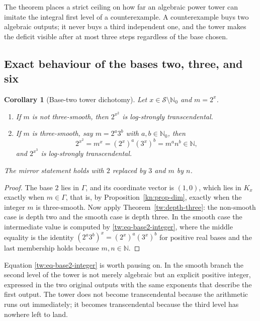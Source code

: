 \documentclass[11pt,oneside]{article}
\newtheorem{corollary}[theorem]{Corollary}
\theoremstyle{definition}
\theoremstyle{remark}
\newcommand{\N}{\mathbb N}
\newcommand{\Nzero}{\mathbb N_0}
\newcommand{\Sol}{\mathcal S}
\newcommand{\GammaSat}{\Gamma}
\begin{document}
The theorem places a strict ceiling on how far an algebraic power tower can imitate the
integral first level of a counterexample.  A counterexample buys two algebraic outputs; it
never buys a third independent one, and the tower makes the deficit visible after at most
three steps regardless of the base chosen.

\subsection{Exact behaviour of the bases two, three, and six}

\begin{corollary}[Base-two tower dichotomy]
\label{tw:base2-tower}
Let $x\in\Sol\setminus\Nzero$ and $m=2^x$.
\begin{enumerate}[label=\textup{(\alph*)}]
\item If $m$ is not three-smooth, then $2^{x^2}$ is log-strongly transcendental.
\item If $m$ is three-smooth, say $m=2^a3^b$ with $a,b\in\Nzero$, then
\begin{equation}
 2^{x^2}=m^x=(2^x)^a(3^x)^b=m^an^b\in\N,
 \label{tw:eq-base2-integer}
\end{equation}
and $2^{x^3}$ is log-strongly transcendental.
\end{enumerate}
The mirror statement holds with $2$ replaced by $3$ and $m$ by $n$.
\end{corollary}

\begin{proof}
The base $2$ lies in $\GammaSat$, and its coordinate vector is $(1,0)$, which lies in $K_x$
exactly when $m\in\GammaSat$, that is, by Proposition~\ref{kn:prop-dim}, exactly when
the integer $m$ is three-smooth.  Now apply Theorem~\ref{tw:depth-three}: the non-smooth case
is depth two and the smooth case is depth three.  In the smooth case the intermediate value
is computed by \eqref{tw:eq-base2-integer}, where the middle equality is the identity
$(2^a3^b)^x=(2^x)^a(3^x)^b$ for positive real bases and the last membership holds because
$m,n\in\N$.
\end{proof}

Equation \eqref{tw:eq-base2-integer} is worth pausing on.  In the smooth branch the second
level of the tower is not merely algebraic but an explicit positive integer, expressed in the
two original outputs with the same exponents that describe the first output.  The tower does
not become transcendental because the arithmetic runs out immediately; it becomes
transcendental because the third level has nowhere left to land.
\end{document}
